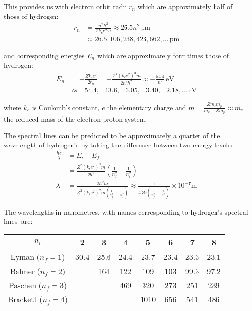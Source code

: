 \documentclass[a4paper]{scrartcl}
\begin{document}
This provides us with electron orbit radii \(r_n\) which are approximately half of those of hydrogen:
\begin{align*}
    r_n &= \frac{n^2 \hbar^2}{Z k_e e^2 m} \approx 26.5 n^2 \,\si{\pico\metre} \\
    &\approx 26.5, 106, 238, 423, 662, ... \,\si{\pico\metre}
\end{align*}

and corresponding energies \(E_n\) which are approximately four times those of hydrogen:
\begin{align*}
    E_n &= -\frac{Z k_e e^2}{2 r_n} = -\frac{Z^2 (k_e e^2)^2 m}{2 n^2 \hbar^2} \approx -\frac{54.4}{n^2} \,\si{\electronvolt} \\
    &\approx -54.4, -13.6, -6.05, -3.40, -2.18, ... \,\si{\electronvolt}
\end{align*}

where \(k_e\) is Coulomb's constant, \(e\) the elementary charge and \(m = \frac{Z m_e m_p}{m_e + Z m_p} \approx m_e\) the reduced mass of the electron-proton system.

The spectral lines can be predicted to be approximately a quarter of the wavelength of hydrogen's by taking the difference between two energy levels:
\begin{align*}
    \frac{h c}{\lambda} &= E_i - E_f \\
    &= \frac{Z^2 (k_e e^2)^2 m}{2 \hbar^2} \left( \frac{1}{n_f^2} - \frac{1}{n_i^2} \right) \\
    \lambda &= \frac{2 \hbar^2 h c}{Z^2 (k_e e^2)^2 m \left( \frac{1}{n_f^2} - \frac{1}{n_i^2} \right)} \approx \frac{1}{4.39 \left( \frac{1}{n_f^2} - \frac{1}{n_i^2} \right)} \times 10^{-7} \si{\metre}
\end{align*}

The wavelengths in nanometres, with names corresponding to hydrogen's spectral lines, are:
\begin{center}
    \begin{tabular}{c | c | c | c | c | c | c | c}
        \(n_i\) & 2 & 3 & 4 & 5 & 6 & 7 & 8 \\
        \hline
        Lyman (\(n_f = 1\)) & 30.4 & 25.6 & 24.4 & 23.7 & 23.4 & 23.3 & 23.1 \\
        Balmer (\(n_f = 2\)) & & 164 & 122 & 109 & 103 & 99.3 & 97.2 \\
        Paschen (\(n_f = 3\)) & & & 469 & 320 & 273 & 251 & 239 \\
        Brackett (\(n_f = 4\)) & & & & 1010 & 656 & 541 & 486 \\
        \hline
    \end{tabular}
\end{center}
\end{document}
